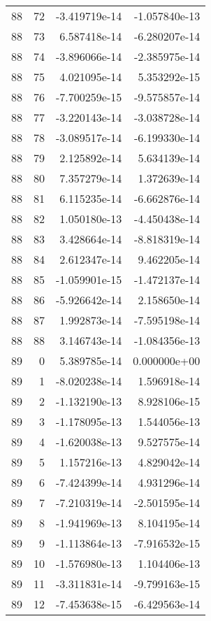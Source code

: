 \begin{tabular}{rrrr}
  88 &   72 & -3.419719e-14 & -1.057840e-13 \\
  88 &   73 &  6.587418e-14 & -6.280207e-14 \\
  88 &   74 & -3.896066e-14 & -2.385975e-14 \\
  88 &   75 &  4.021095e-14 &  5.353292e-15 \\
  88 &   76 & -7.700259e-15 & -9.575857e-14 \\
  88 &   77 & -3.220143e-14 & -3.038728e-14 \\
  88 &   78 & -3.089517e-14 & -6.199330e-14 \\
  88 &   79 &  2.125892e-14 &  5.634139e-14 \\
  88 &   80 &  7.357279e-14 &  1.372639e-14 \\
  88 &   81 &  6.115235e-14 & -6.662876e-14 \\
  88 &   82 &  1.050180e-13 & -4.450438e-14 \\
  88 &   83 &  3.428664e-14 & -8.818319e-14 \\
  88 &   84 &  2.612347e-14 &  9.462205e-14 \\
  88 &   85 & -1.059901e-15 & -1.472137e-14 \\
  88 &   86 & -5.926642e-14 &  2.158650e-14 \\
  88 &   87 &  1.992873e-14 & -7.595198e-14 \\
  88 &   88 &  3.146743e-14 & -1.084356e-13 \\
  89 &    0 &  5.389785e-14 &  0.000000e+00 \\
  89 &    1 & -8.020238e-14 &  1.596918e-14 \\
  89 &    2 & -1.132190e-13 &  8.928106e-15 \\
  89 &    3 & -1.178095e-13 &  1.544056e-13 \\
  89 &    4 & -1.620038e-13 &  9.527575e-14 \\
  89 &    5 &  1.157216e-13 &  4.829042e-14 \\
  89 &    6 & -7.424399e-14 &  4.931296e-14 \\
  89 &    7 & -7.210319e-14 & -2.501595e-14 \\
  89 &    8 & -1.941969e-13 &  8.104195e-14 \\
  89 &    9 & -1.113864e-13 & -7.916532e-15 \\
  89 &   10 & -1.576980e-13 &  1.104406e-13 \\
  89 &   11 & -3.311831e-14 & -9.799163e-15 \\
  89 &   12 & -7.453638e-15 & -6.429563e-14 \\

\end{tabular}
